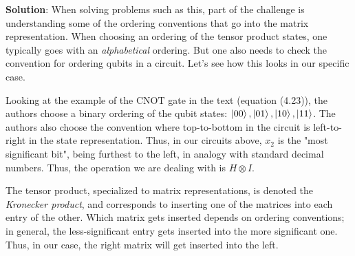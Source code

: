 \documentclass{book}
\begin{document}
    \textbf{Solution}: When solving problems such as this, part of the challenge is understanding some of the ordering conventions that go into the matrix representation. When choosing an ordering of the tensor product states, one typically goes with an \emph{alphabetical} ordering. But one also needs to check the convention for ordering qubits in a circuit. Let's see how this looks in our specific case.

    Looking at the example of the $\mathrm{CNOT}$ gate in the text (equation (4.23)), the authors choose a binary ordering of the qubit states: $\ket{00}, \ket{01}, \ket{10}, \ket{11}$. The authors also choose the convention where top-to-bottom in the circuit is left-to-right in the state representation. Thus, in our circuits above, $x_2$ is the "most significant bit", being furthest to the left, in analogy with standard decimal numbers. Thus, the operation we are dealing with is $H \otimes I$.

    The tensor product, specialized to matrix representations, is denoted the \emph{Kronecker product}, and corresponds to inserting one of the matrices into each entry of the other. Which matrix gets inserted depends on ordering conventions; in general, the less-significant entry gets inserted into the more significant one. Thus, in our case, the right matrix will get inserted into the left.
\end{document}

